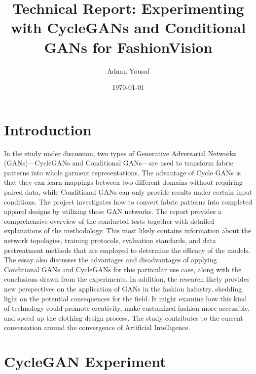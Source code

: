 \documentclass{article}
\begin{document}
\title{Technical Report: Experimenting with CycleGANs and Conditional GANs for FashionVision}
\author{Adnan Yousaf}
\date{\today}
\maketitle

\section{Introduction}
In the study under discussion, two types of Generative Adversarial Networks (GANs)—CycleGANs and Conditional GANs—are used to transform fabric patterns into whole garment representations. The advantage of Cycle GANs is that they can learn mappings between two different domains without requiring paired data, while Conditional GANs can only provide results under certain input conditions. The project investigates how to convert fabric patterns into completed apparel designs by utilizing these GAN networks.
The report provides a comprehensive overview of the conducted tests together with detailed explanations of the methodology. This most likely contains information about the network topologies, training protocols, evaluation standards, and data pretreatment methods that are employed to determine the efficacy of the models. The essay also discusses the advantages and disadvantages of applying Conditional GANs and CycleGANs for this particular use case, along with the conclusions drawn from the experiments.
In addition, the research likely provides new perspectives on the application of GANs in the fashion industry, shedding light on the potential consequences for the field. It might examine how this kind of technology could promote creativity, make customized fashion more accessible, and speed up the clothing design process. The study contributes to the current conversation around the convergence of Artificial Intelligence.




\section{CycleGAN Experiment}
\end{document}
